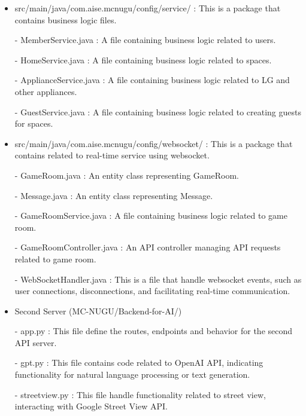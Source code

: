 \documentclass[conference]{IEEEtran}
\begin{document}
\begin{itemize}
                \item src/main/java/com.aise.mcnugu/config/service/ : This is a package that contains business logic files.
                    \item[-] MemberService.java : A file containing business logic related to users.
                    \item[-] HomeService.java : A file containing business logic related to spaces.
                    \item[-] ApplianceService.java : A file containing business logic related to LG and other appliances.
                    \item[-] GuestService.java : A file containing business logic related to creating guests for spaces.
                \vspace{3mm}

                \item  src/main/java/com.aise.mcnugu/config/websocket/ : This is a package that contains related to real-time service using websocket.
                    \item[-] GameRoom.java : An entity class representing GameRoom.
                    \item[-] Message.java : An entity class representing Message.
                    \item[-] GameRoomService.java : A file containing business logic related to game room.
                    \item[-] GameRoomController.java : An API controller managing API requests related to game room.
                    \item[-] WebSocketHandler.java : This is a file that handle websocket events, such as user connections, disconnections, and facilitating real-time communication.
                \vspace{3mm}

                \item Second Server (MC-NUGU/Backend-for-AI/)
                    \item[-] app.py : This file define the routes, endpoints and behavior for the second API server.
                    \item[-] gpt.py : This file contains code related to OpenAI API, indicating functionality for natural language processing or text generation.
                    \item[-] streetview.py : This file handle functionality related to street view, interacting with Google Street View API.

                
            \end{itemize}
        
\end{document}

